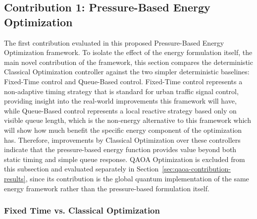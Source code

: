 \documentclass[12pt]{article}
\begin{document}
\subsection{Contribution 1: Pressure-Based Energy Optimization}

The first contribution evaluated in this proposed Pressure-Based Energy Optimization framework. To isolate the effect of the energy formulation itself, the main novel contribution of the framework, this section compares the deterministic Classical Optimization controller against the two simpler deterministic baselines: Fixed-Time control and Queue-Based control. Fixed-Time control represents a non-adaptive timing strategy that is standard for urban traffic signal control, providing insight into the real-world improvements this framework will have, while Queue-Based control represents a local reactive strategy based only on visible queue length, which is the non-energy alternative to this framework which will show how much benefit the specific energy component of the optimization has. Therefore, improvements by Classical Optimization over these controllers indicate that the pressure-based energy function provides value beyond both static timing and simple queue response. QAOA Optimization is excluded from this subsection and evaluated separately in Section~\ref{sec:qaoa-contribution-results}, since its contribution is the global quantum implementation of the same energy framework rather than the pressure-based formulation itself.
\subsubsection{Fixed Time vs. Classical Optimization}
\end{document}
